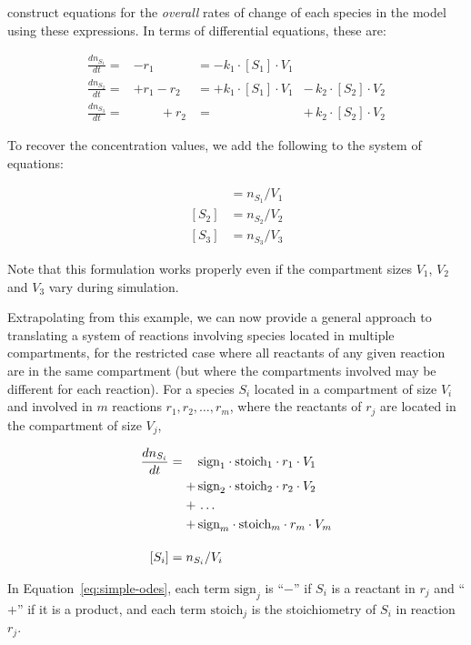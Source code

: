 construct equations for the \emph{overall} rates of change of each
species in the model using these expressions.  In terms of
differential equations, these are:
\begin{linenomath}
\begin{equation*}
  \begin{aligned}
  \frac{dn_{S_1}}{dt} = &- r_1                    &= - k_1 \cdot [S_1] \cdot V_1 &{}\\[4pt]
  \frac{dn_{S_2}}{dt} = &+ r_1 - r_2              &= + k_1 \cdot [S_1] \cdot V_1 &-\, k_2 \cdot [S_2] \cdot V_2\\[4pt]
  \frac{dn_{S_3}}{dt} = &\phantom{{}+ r_1} + r_2  &= \phantom{+ k_1 \cdot [S_2] \cdot V_1} &+\, k_2 \cdot [S_2] \cdot V_2
\end{aligned}
\end{equation*}
\end{linenomath}
To recover the concentration values, we add the following to the
system of equations:
\begin{linenomath}
\begin{align*}
  [S_1] &= n_{S_1}/V_1\\
  [S_2] &= n_{S_2}/V_2\\
  [S_3] &= n_{S_3}/V_3
\end{align*}
\end{linenomath}
Note that this formulation works properly even if the compartment
sizes $V_1$, $V_2$ and $V_3$ vary during simulation.  

Extrapolating from this example, we can now provide a general
approach to translating a system of reactions involving species
located in multiple compartments, for the restricted case where
all reactants of any given reaction are in the same compartment
(but where the compartments involved may be different for each
reaction).  For a species $S_i$ located in a compartment of size
$V_i$ and involved in $m$ reactions $r_1, r_2, \ldots, r_m$, where
the reactants of $r_j$ are located in the compartment of size
$V_j$,
\begin{linenomath}
\begin{equation} \label{eq:simple-odes}
  \begin{split}
    \frac{dn_{S_i}}{dt} &= \relphantom{+}\,\text{sign}_1 \cdot \text{stoich}_1 \cdot r_1 \cdot V_1\\
    &\relphantom{=} +\, \text{sign}_2 \cdot \text{stoich}_2 \cdot r_2 \cdot V_2\\
    &\relphantom{=} +\, \ldots \\
    &\relphantom{=} +\, \text{sign}_m \cdot \text{stoich}_m \cdot r_m \cdot V_m\\
    \\[-4pt]
    [S_i] &= n_{S_i}/V_i
  \end{split}
\end{equation}
\end{linenomath}
In Equation~\eqref{eq:simple-odes}, each term $\text{sign}_j$ is
``$-$'' if $S_i$ is a reactant in $r_j$ and ``$+$'' if it is a
product, and each term $\text{stoich}_j$ is the stoichiometry of
$S_i$ in reaction $r_j$.


